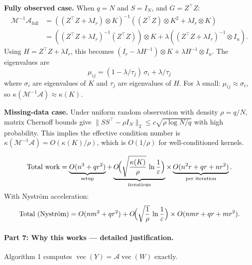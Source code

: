 \begin{theorem}\label{thm:p10-condnum}
\textbf{Fully observed case.} When $q = N$ and $S = I_N$, and $G = Z^\top Z$:
\begin{align*}
  \mathcal{M}^{-1}\mathcal{A}_{\text{full}}
  &= ((Z^\top Z + \lambda I_r)\otimes K)^{-1}((Z^\top Z)\otimes K^2 + \lambda I_r\otimes K)\\
  &= ((Z^\top Z + \lambda I_r)^{-1}(Z^\top Z))\otimes K + \lambda((Z^\top Z + \lambda I_r)^{-1}\otimes I_n).
\end{align*}
Using $H = Z^\top Z + \lambda I_r$, this becomes $(I_r - \lambda H^{-1})\otimes K + \lambda H^{-1}\otimes I_n$.
The eigenvalues are
\[
  \mu_{ij} = (1 - \lambda/\tau_j)\,\sigma_i + \lambda/\tau_j
\]
where $\sigma_i$ are eigenvalues of $K$ and $\tau_j$ are eigenvalues of $H$.
For $\lambda$ small: $\mu_{ij} \approx \sigma_i$, so
$\kappa(\mathcal{M}^{-1}\mathcal{A}) \approx \kappa(K)$.

\textbf{Missing-data case.} Under uniform random observation with density
$\rho = q/N$, matrix Chernoff bounds give
$\|SS^\top - \rho I_N\|_2 \leq c\sqrt{\rho\log N/q}$ with high probability.
This implies the effective condition number is
$\kappa(\mathcal{M}^{-1}\mathcal{A}) = O(\kappa(K)/\rho)$,
which is $O(1/\rho)$ for well-conditioned kernels.
\end{theorem}

\begin{corollary}\label{cor:p10-total}
\begin{equation}\label{eq:p10-total}
  \text{Total work} = \underbrace{O(n^3 + qr^2)}_{\text{setup}}
  + \underbrace{O\!\Bigl(\sqrt{\frac{\kappa(K)}{\rho}}\,\ln\frac{1}{\varepsilon}\Bigr)}_{\text{iterations}}
  \times \underbrace{O(n^2 r + qr + nr^2)}_{\text{per iteration}}.
\end{equation}
With Nystr\"om acceleration:
\[
  \text{Total (Nystr\"om)} = O(nm^2 + qr^2)
  + O\!\Bigl(\sqrt{\frac{1}{\rho}}\,\ln\frac{1}{\varepsilon}\Bigr)
  \times O(nmr + qr + mr^2).
\]
\end{corollary}

\paragraph{Part 7: Why this works --- detailed justification.}

\begin{theorem}\label{thm:p10-matvec-correct}
Algorithm 1 computes $\operatorname{vec}(Y) = \mathcal{A}\operatorname{vec}(W)$ exactly.
\end{theorem}

